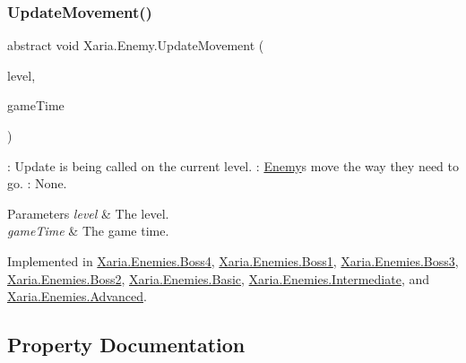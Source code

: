 \mbox{\label{classXaria_1_1Enemy_abe1058263c5512b5e098e73d3b6d704c}} 
\subsubsection{\texorpdfstring{Update\+Movement()}{UpdateMovement()}}
{\footnotesize\ttfamily abstract void Xaria.\+Enemy.\+Update\+Movement (\begin{DoxyParamCaption}\item[{\hyperlink{classXaria_1_1Level}{Level}}]{level,  }\item[{Game\+Time}]{game\+Time }\end{DoxyParamCaption})\hspace{0.3cm}{\ttfamily [pure virtual]}}



\+: Update is being called on the current level. \+: \hyperlink{classXaria_1_1Enemy}{Enemy}\textquotesingle{}s move the way they need to go. \+: None. 


\begin{DoxyParams}{Parameters}
{\em level} & The level.\\
\hline
{\em game\+Time} & The game time.\\
\hline
\end{DoxyParams}


Implemented in \hyperlink{classXaria_1_1Enemies_1_1Boss4_a7962281c412a9192916819e463d625d2}{Xaria.\+Enemies.\+Boss4}, \hyperlink{classXaria_1_1Enemies_1_1Boss1_aed5d8f9843c47b9022104ea2de498830}{Xaria.\+Enemies.\+Boss1}, \hyperlink{classXaria_1_1Enemies_1_1Boss3_a60ae20b9df383474b5a59b0339773612}{Xaria.\+Enemies.\+Boss3}, \hyperlink{classXaria_1_1Enemies_1_1Boss2_a6121cd1be6449c71e579ab4d59398a9a}{Xaria.\+Enemies.\+Boss2}, \hyperlink{classXaria_1_1Enemies_1_1Basic_a1f8c20016b8ea5c18fca1295510952c9}{Xaria.\+Enemies.\+Basic}, \hyperlink{classXaria_1_1Enemies_1_1Intermediate_a2b9bcfbfd205f279db56bb86c776c07a}{Xaria.\+Enemies.\+Intermediate}, and \hyperlink{classXaria_1_1Enemies_1_1Advanced_a1b3201d7cb5a9aeb8c6bf3fa99b0e194}{Xaria.\+Enemies.\+Advanced}.



\subsection{Property Documentation}
\mbox{\label{classXaria_1_1Enemy_a5eeea6a504a8f722663fffd8d6f3618a}} 
